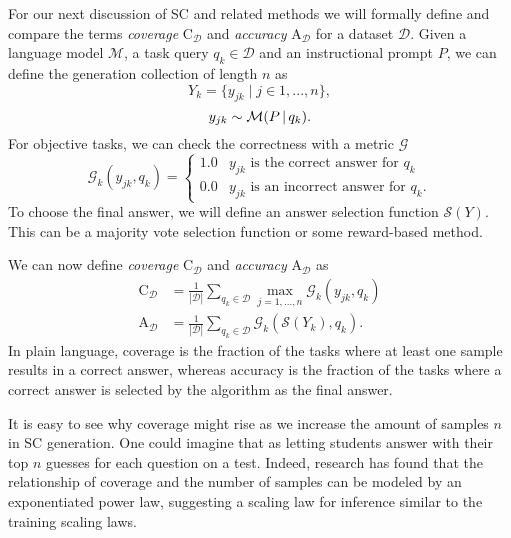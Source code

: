 For our next discussion of SC and related methods we will formally define and compare the terms \textit{coverage} $\mathrm{C}_{\mathcal{D}}$ and \textit{accuracy} $\mathrm{A}_{\mathcal{D}}$ for a dataset ${\mathcal{D}}$.
Given a language model $\mathcal{M}$, a task query $q_k \in {\mathcal{D}}$ and an instructional prompt $P$, we can define the generation collection of length $n$ as
\begin{equation}
    Y_k = \{y_{jk}\mid j \in 1, ..., n\},
\end{equation}
\begin{equation}
    y_{jk} \sim \mathcal{M}(P \, \vert \, q_k).
\end{equation}
For objective tasks, we can check the correctness with a metric $\mathcal{G}$
\begin{equation}
    \mathcal{G}_{k}(y_{jk}, q_k) = 
    \begin{cases}
        1.0 & y_{jk} \text{ is the correct answer for } q_k\\
        0.0 & y_{jk} \text{ is an incorrect answer for } q_k.
    \end{cases}
\end{equation}
To choose the final answer, we will define an answer selection function $\mathcal{S}(Y)$. 
This can be a majority vote selection function or some reward-based method.

We can now define \textit{coverage} $\mathrm{C}_{\mathcal{D}}$ and \textit{accuracy} $\mathrm{A}_{\mathcal{D}}$ as
\begin{align}
    \mathrm{C}_{\mathcal{D}} &= \frac{1}{|\mathcal{D}|} \sum_{q_k \in \mathcal{D}} \max_{j=1,...,n} \mathcal{G}_k(y_{jk}, q_k) \\
    \mathrm{A}_{\mathcal{D}} &= \frac{1}{|\mathcal{D}|} \sum_{q_k \in \mathcal{D}} \mathcal{G}_k\left( \mathcal{S}(Y_k), q_k \right).
\end{align}
In plain language, coverage is the fraction of the tasks where at least one sample results in a correct answer,
whereas accuracy is the fraction of the tasks where a correct answer is selected by the algorithm as the final answer.

It is easy to see why coverage might rise as we increase the amount of samples $n$ in SC generation.
One could imagine that as letting students answer with their top $n$ guesses for each question on a test. 
Indeed, research\cite{brown2024largelanguagemonkeysscaling} has found that the relationship of coverage and the 
number of samples can be modeled by an exponentiated power law, suggesting a scaling law for inference
similar to the training scaling laws\cite{kaplan2020scalinglawsneurallanguage}.

